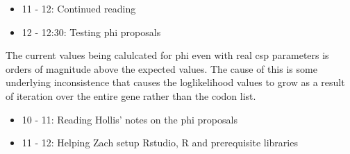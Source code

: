 \documentclass[12pt,hyperref]{labbook}
\begin{document}
\begin{itemize}
    \item 11 - 12: Continued reading
    \item 12 - 12:30: Testing phi proposals
\end{itemize}
The current values being calulcated for phi even with real csp parameters is orders of magnitude above the
expected values. The cause of this is some underlying inconsistence that causes the loglikelihood values
to grow as a result of iteration over the entire gene rather than the codon list.
\begin{itemize}
    \item 10 - 11: Reading Hollis' notes on the phi proposals
    \item 11 - 12: Helping Zach setup Rstudio, R and prerequisite libraries
\end{itemize}
\end{document}
